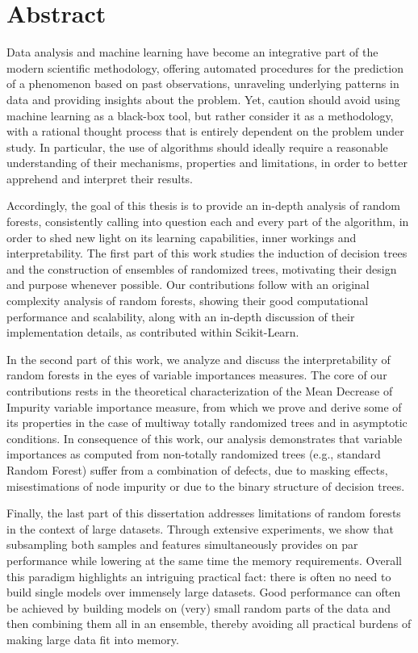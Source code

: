 
\chapter*{Abstract}

Data analysis and machine learning have become an integrative part of the
modern scientific methodology, offering automated procedures for the prediction
of a phenomenon based on past observations, unraveling underlying patterns in
data and providing insights about the problem. Yet, caution should
avoid using machine learning as a black-box tool, but rather consider it as a
methodology, with a rational thought process that is entirely dependent on the
problem under study. In particular, the use of algorithms
should ideally require a reasonable understanding of their
mechanisms, properties and limitations, in order to better apprehend and
interpret their results.

Accordingly, the goal of this thesis is to provide an in-depth
analysis of random forests, consistently calling into
question each and every part of the algorithm, in order to shed new light on
its learning capabilities, inner workings and interpretability. The first
part of this work studies the induction of decision trees and the construction of
ensembles of randomized trees, motivating their design and purpose whenever
possible. Our contributions follow with an original complexity
analysis of random forests, showing their good computational performance
and scalability, along with an in-depth discussion of their
implementation details, as contributed within Scikit-Learn.

In the second part of this work, we analyze and discuss the interpretability of
random forests in the eyes of variable importances measures. The core of our
contributions rests in the theoretical characterization of the Mean Decrease of
Impurity variable importance measure, from which we prove and derive some of
its properties in the case of multiway totally randomized trees and in
asymptotic conditions. In consequence of this work, our analysis  demonstrates
that variable importances as computed from non-totally randomized trees (e.g.,
standard Random Forest) suffer from a combination of defects, due to masking
effects, misestimations of node impurity or due to the binary structure of
decision trees.

Finally, the last part of this dissertation addresses limitations of random
forests in the context of large datasets. Through extensive experiments, we
show that subsampling both samples and features simultaneously provides on par
performance while lowering at the same time the memory requirements. Overall
this paradigm highlights an intriguing practical fact: there is often no need
to build single models over immensely large datasets. Good performance can
often be achieved by building models on (very) small random parts of the data
and then combining them all in an ensemble, thereby avoiding all practical
burdens of making large data fit into memory.
